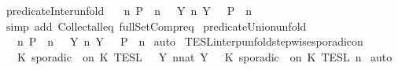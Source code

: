 \begin{isabellebody}
\isanewline
\isanewline
{}\isamarkupfalse%
\ predicate{\isacharunderscore}Inter{\isacharunderscore}unfold{\isacharcolon}\isanewline
\ \ {\isacartoucheopen}{\isacharbraceleft}{\isasymrho}{\isachardot}\ {\isasymforall}n{\isachardot}\ P\ {\isasymrho}\ n{\isacharbraceright}\ {\isacharequal}\ {\isasymInter}\ {\isacharbraceleft}Y{\isachardot}\ {\isasymexists}n{\isachardot}\ Y\ {\isacharequal}\ {\isacharbraceleft}{\isasymrho}{\isachardot}\ P\ {\isasymrho}\ n{\isacharbraceright}{\isacharbraceright}{\isacartoucheclose}\isanewline
%
\isadelimproof
%
\endisadelimproof
%
\isatagproof
{}\isamarkupfalse%
\ {\isacharparenleft}simp\ add{\isacharcolon}\ Collect{\isacharunderscore}all{\isacharunderscore}eq\ full{\isacharunderscore}SetCompr{\isacharunderscore}eq{\isacharparenright}%
\endisatagproof
{\isafoldproof}%
%
\isadelimproof
\isanewline
%
\endisadelimproof
\isanewline
{}\isamarkupfalse%
\ predicate{\isacharunderscore}Union{\isacharunderscore}unfold{\isacharcolon}\isanewline
\ \ {\isacartoucheopen}{\isacharbraceleft}{\isasymrho}{\isachardot}\ {\isasymexists}n{\isachardot}\ P\ {\isasymrho}\ n{\isacharbraceright}\ {\isacharequal}\ {\isasymUnion}\ {\isacharbraceleft}Y{\isachardot}\ {\isasymexists}n{\isachardot}\ Y\ {\isacharequal}\ {\isacharbraceleft}{\isasymrho}{\isachardot}\ P\ {\isasymrho}\ n{\isacharbraceright}{\isacharbraceright}{\isacartoucheclose}\isanewline
%
\isadelimproof
%
\endisadelimproof
%
\isatagproof
{}\isamarkupfalse%
\ auto%
\endisatagproof
{\isafoldproof}%
%
\isadelimproof
\isanewline
%
\endisadelimproof
\isanewline
{}\isamarkupfalse%
\ TESL{\isacharunderscore}interp{\isacharunderscore}unfold{\isacharunderscore}stepwise{\isacharunderscore}sporadicon{\isacharcolon}\isanewline
\ \ {\isacartoucheopen}{\isasymlbrakk}\ K\ sporadic\ {\isasymtau}\ on\ K\ {\isasymrbrakk}\isactrlsub T\isactrlsub E\isactrlsub S\isactrlsub L\ {\isacharequal}\ {\isasymUnion}\ {\isacharbraceleft}Y{\isachardot}\ {\isasymexists}n{\isacharcolon}{\isacharcolon}nat{\isachardot}\ Y\ {\isacharequal}\ {\isasymlbrakk}\ K\ sporadic\ {\isasymtau}\ on\ K\ {\isasymrbrakk}\isactrlsub T\isactrlsub E\isactrlsub S\isactrlsub L\isactrlbsup {\isasymge}\ n\isactrlesup {\isacharbraceright}{\isacartoucheclose}\isanewline
%
\isadelimproof
%
\endisadelimproof
%
\isatagproof
{}\isamarkupfalse%
\ auto%
\endisatagproof
{\isafoldproof}%
%
\isadelimproof
\isanewline
%
\endisadelimproof
\isanewline
{}\isamarkupfalse%

\end{isabellebody}
